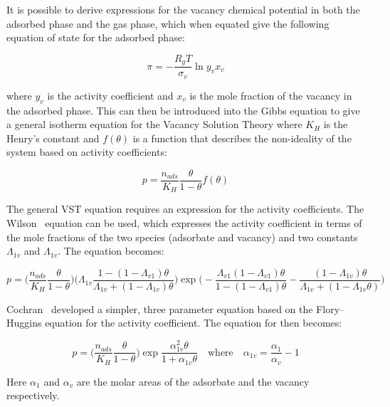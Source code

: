 It is possible to derive expressions for the vacancy chemical potential in both
the adsorbed phase and the gas phase, which when equated give the following equation
of state for the adsorbed phase:

\begin{equation}
    \pi = - \frac{R_g T}{\sigma_v} \ln{y_v x_v}
\end{equation}

where \(y_v\) is the activity coefficient and  \(x_v\) is the mole fraction of
the vacancy in the adsorbed phase.
This can then be introduced into the Gibbs equation to give a general isotherm equation
for the Vacancy Solution Theory where \(K_H\) is the Henry’s constant and
\(f(\theta)\) is a function that describes the non-ideality of the system based
on activity coefficients:

\begin{equation}
    p = \frac{n_{ads}}{K_H} \frac{\theta}{1-\theta} f(\theta)
\end{equation}

The general VST equation requires an expression for the activity coefficients.
The Wilson~\cite{suwanayuenGasAdsorptionIsotherm1980} equation can be used, 
which expresses the activity coefficient in terms
of the mole fractions of the two species (adsorbate and vacancy) and two constants
\(\Lambda_{1v}\) and \(\Lambda_{1v}\). The equation becomes:

\begin{equation}\label{pyg:eqn:wvst}
    p = \bigg( \frac{n_{ads}}{K_H} \frac{\theta}{1-\theta} \bigg)
    \bigg( \Lambda_{1v} \frac{1-(1-\Lambda_{v1})\theta}{\Lambda_{1v}+(1-\Lambda_{1v})\theta} \bigg)
    \exp{\bigg( -\frac{\Lambda_{v1}(1-\Lambda_{v1})\theta}{1-(1-\Lambda_{v1})\theta}
    -\frac{(1 - \Lambda_{1v})\theta}{\Lambda_{1v} + (1-\Lambda_{1v}\theta)} \bigg)}
\end{equation}

Cochran~\cite{cochranVacancySolutionTheory1985} 
developed a simpler, three parameter equation based on
the Flory–Huggins equation for the activity coefficient.
The equation for then becomes:

\begin{equation}\label{pyg:eqn:fhvst}
    p = \bigg( \frac{n_{ads}}{K_H} \frac{\theta}{1-\theta} \bigg)
        \exp{\frac{\alpha^2_{1v}\theta}{1+\alpha_{1v}\theta}} 
        \quad \text{where} \quad
    \alpha_{1v} = \frac{\alpha_{1}}{\alpha_{v}} - 1
\end{equation}

Here \(\alpha_{1}\) and \(\alpha_{v}\) are the molar areas of the adsorbate
and the vacancy respectively.


